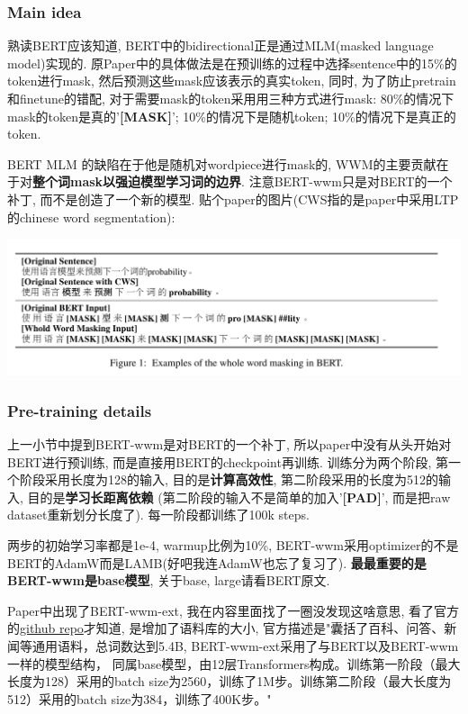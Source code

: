 \documentclass{article}
\begin{document}
\subsubsection{Main idea}

熟读BERT应该知道, BERT中的bidirectional正是通过MLM(masked language model)实现的. 原Paper中的具体做法是在预训练的过程中选择sentence中的15\%的token进行mask,
然后预测这些mask应该表示的真实token, 同时, 为了防止pretrain和finetune的错配, 对于需要mask的token采用用三种方式进行mask: 80\%的情况下mask的token是真的'\textbf{[MASK]}';
10\%的情况下是随机token; 10\%的情况下是真正的token.

BERT MLM 的缺陷在于他是随机对wordpiece进行mask的, WWM的主要贡献在于对\textbf{整个词mask以强迫模型学习词的边界}.
注意BERT-wwm只是对BERT的一个补丁, 而不是创造了一个新的模型.
贴个paper的图片(CWS指的是paper中采用LTP的chinese word segmentation):

\includegraphics[scale=0.27]{BERT-wmm.png}

\subsubsection{Pre-training details}

上一小节中提到BERT-wwm是对BERT的一个补丁, 所以paper中没有从头开始对BERT进行预训练, 而是直接用BERT的checkpoint再训练.
训练分为两个阶段, 第一个阶段采用长度为128的输入, 目的是\textbf{计算高效性}, 第二阶段采用的长度为512的输入, 目的是\textbf{学习长距离依赖}
(第二阶段的输入不是简单的加入'\textbf{[PAD]}', 而是把raw dataset重新划分长度了). 每一阶段都训练了100k steps.

两步的初始学习率都是1e-4, warmup比例为10\%, BERT-wwm采用optimizer的不是BERT的AdamW而是LAMB(好吧我连AdamW也忘了复习了).
\textbf{最最重要的是BERT-wwm是base模型}, 关于base, large请看BERT原文.

Paper中出现了BERT-wwm-ext, 我在内容里面找了一圈没发现这啥意思, 看了官方的\href{https://github.com/ymcui/Chinese-BERT-wwm}{github repo}才知道,
是增加了语料库的大小, 官方描述是"囊括了百科、问答、新闻等通用语料，总词数达到5.4B, BERT-wwm-ext采用了与BERT以及BERT-wwm一样的模型结构，
同属base模型，由12层Transformers构成。训练第一阶段（最大长度为128）采用的batch size为2560，训练了1M步。训练第二阶段（最大长度为512）采用的batch size为384，训练了400K步。"
\end{document}
